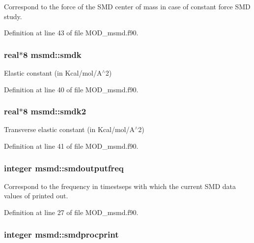 Correspond to the force of the S\-M\-D center of mass in case of constant force S\-M\-D study. 



Definition at line 43 of file M\-O\-D\-\_\-msmd.\-f90.

\hypertarget{classmsmd_a00a3fbfb67f2675eef2955590ca83a72}{
\subsubsection[{smdk}]{\setlength{\rightskip}{0pt plus 5cm}real$\ast$8 msmd\-::smdk}}\label{classmsmd_a00a3fbfb67f2675eef2955590ca83a72}


Elastic constant (in Kcal/mol/\-A$^\wedge$2) 



Definition at line 40 of file M\-O\-D\-\_\-msmd.\-f90.

\hypertarget{classmsmd_ac7b1d430b9652f2e07695a4ca5310b7f}{
\subsubsection[{smdk2}]{\setlength{\rightskip}{0pt plus 5cm}real$\ast$8 msmd\-::smdk2}}\label{classmsmd_ac7b1d430b9652f2e07695a4ca5310b7f}


Transverse elastic constant (in Kcal/mol/\-A$^\wedge$2) 



Definition at line 41 of file M\-O\-D\-\_\-msmd.\-f90.

\hypertarget{classmsmd_a3e8ffd20ee86a6e8fc6a0f028ad70495}{
\subsubsection[{smdoutputfreq}]{\setlength{\rightskip}{0pt plus 5cm}integer msmd\-::smdoutputfreq}}\label{classmsmd_a3e8ffd20ee86a6e8fc6a0f028ad70495}


Correspond to the frequency in timestseps with which the current S\-M\-D data values of printed out. 



Definition at line 27 of file M\-O\-D\-\_\-msmd.\-f90.

\hypertarget{classmsmd_a8f356834ac2c3a70a860a4e993eb3b1d}{
\subsubsection[{smdprocprint}]{\setlength{\rightskip}{0pt plus 5cm}integer msmd\-::smdprocprint}}\label{classmsmd_a8f356834ac2c3a70a860a4e993eb3b1d}


